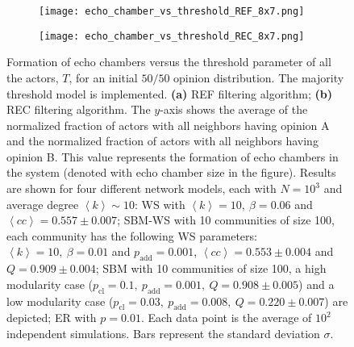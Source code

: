 \documentclass[11 pt , letterpaper , twoside , openright]{book}
\begin{document}
\begin{figure}[H]
  \begin{subfigure}[b]{0.49\textwidth}
    \caption{}
  	\texttt{[image: echo\_chamber\_vs\_threshold\_REF\_8x7.png]}
    \label{REF_thres}
  \end{subfigure}
  \begin{subfigure}[b]{0.49\textwidth}
    \caption{}
  	\texttt{[image: echo\_chamber\_vs\_threshold\_REC\_8x7.png]}
    \label{REC_thres}
  \end{subfigure}
  \captionsetup{format=plain}
  \caption[Formation of echo chambers versus the threshold parameter of all the actors, $T$, for the REF and REC filtering algorithms and an initial $50/50$ opinion distribution. The majority threshold model is implemented.]{Formation of echo chambers versus the threshold parameter of all the actors, $T$, for an initial $50/50$ opinion distribution. The majority threshold model is implemented. \textbf{(a)} REF filtering algorithm; \textbf{(b)} REC filtering algorithm. The $y$-axis shows the average of the normalized fraction of actors with all neighbors having opinion A and the normalized fraction of actors with all neighbors having opinion B. This value represents the formation of echo chambers in the system (denoted with echo chamber size in the figure). Results are shown for four different network models, each with $N=10^3$ and average degree $\left<k\right> \sim 10$: WS with $\left<k\right> =10,\ \beta = 0.06$ and $\left<cc\right> = 0.557 \pm 0.007$; SBM-WS with 10 communities of size 100, each community has the following WS parameters: $\left<k\right> = 10,\ \beta = 0.01$ and $p_{\text{add}} = 0.001$, $\left<cc\right> = 0.553 \pm 0.004$ and $Q = 0.909 \pm 0.004$; SBM with 10 communities of size 100, a high modularity case ($p_{\text{cl}} = 0.1,\ p_{\text{add}} = 0.001,\ Q = 0.908 \pm 0.005$) and a low modularity case ($p_{\text{cl}} = 0.03,\ p_{\text{add}} = 0.008,\ Q = 0.220 \pm 0.007$) are depicted; ER with $p= 0.01$. Each data point is the average of $10^2$ independent simulations. Bars represent the standard deviation $\sigma$.}
\label{echo_vs_threshold_REF-REC}
\end{figure}
\noindent
\end{document}
